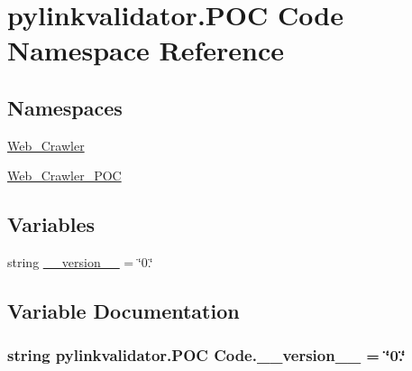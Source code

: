\hypertarget{namespacepylinkvalidator_1_1_p_o_c_01_code}{}\section{pylinkvalidator.\+P\+OC Code Namespace Reference}
\label{namespacepylinkvalidator_1_1_p_o_c_01_code}
\subsection*{Namespaces}
\begin{DoxyCompactItemize}
\item 
 \hyperlink{namespacepylinkvalidator_1_1_p_o_c_01_code_1_1_web___crawler}{Web\+\_\+\+Crawler}
\item 
 \hyperlink{namespacepylinkvalidator_1_1_p_o_c_01_code_1_1_web___crawler___p_o_c}{Web\+\_\+\+Crawler\+\_\+\+P\+OC}
\end{DoxyCompactItemize}
\subsection*{Variables}
\begin{DoxyCompactItemize}
\item 
string \hyperlink{namespacepylinkvalidator_1_1_p_o_c_01_code_ae46fac6f5868586f992149338e72f296}{\+\_\+\+\_\+version\+\_\+\+\_\+} = \char`\"{}0.\char`\"{}
\end{DoxyCompactItemize}


\subsection{Variable Documentation}
\subsubsection[{\+\_\+\+\_\+version\+\_\+\+\_\+}]{\setlength{\rightskip}{0pt plus 5cm}string pylinkvalidator.\+P\+OC Code.\+\_\+\+\_\+version\+\_\+\+\_\+ = \char`\"{}0.\char`\"{}}\hypertarget{namespacepylinkvalidator_1_1_p_o_c_01_code_ae46fac6f5868586f992149338e72f296}{}\label{namespacepylinkvalidator_1_1_p_o_c_01_code_ae46fac6f5868586f992149338e72f296}
